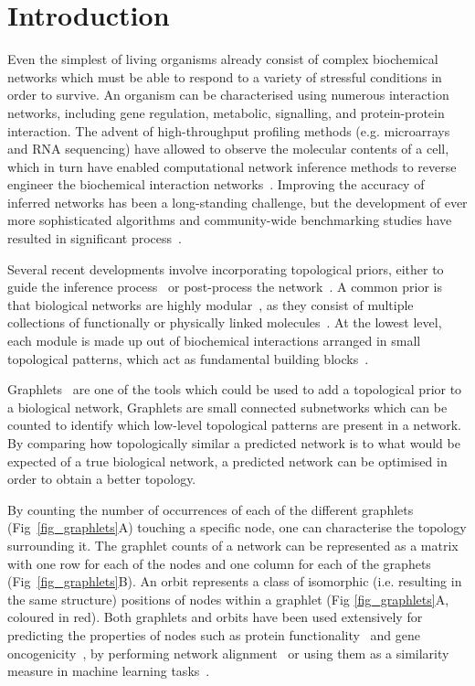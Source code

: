 \section*{Introduction}
Even the simplest of living organisms already consist of complex biochemical networks which must be able to respond to a variety of stressful conditions in order to survive. 
An organism can be characterised using numerous interaction networks, including gene regulation, metabolic, signalling, and protein-protein interaction. 
The advent of high-throughput profiling methods (e.g. microarrays and RNA sequencing) have allowed to observe the molecular contents of a cell, which in turn have enabled computational network inference methods to reverse engineer the biochemical interaction networks~\cite{Albert2007}.
Improving the accuracy of inferred networks has been a long-standing challenge, but the development of ever more sophisticated algorithms and community-wide benchmarking studies have resulted in significant process~\cite{Marbach2010, Narendra2011, Marbach2012, Aijo2017}. 

Several recent developments involve incorporating topological priors, either to guide the inference process~\cite{Lopes2014} or post-process the network~\cite{Ruyssinck2016}.
A common prior is that biological networks are highly modular~\cite{Rives2003}, as they consist of multiple collections of functionally or physically linked molecules~\cite{Hartwell1999,Barabasi2004}. At the lowest level, each module is made up out of biochemical interactions arranged in small topological patterns, which act as fundamental building blocks~\cite{Milo2002}.

Graphlets~\cite{Przulj2004} are one of the tools which could be used to add a topological prior to a biological network,
Graphlets are small connected subnetworks which can be counted to identify which low-level topological patterns are present in a network. By comparing how topologically similar a predicted network is to what would be expected of a true biological network, a predicted network can be optimised in order to obtain a better topology. 

By counting the number of occurrences of each of the different graphlets (Fig~\ref{fig_graphlets}A) touching a specific node, one can characterise the topology surrounding it. The graphlet counts of a network can be represented as a matrix with one row for each of the nodes and one column for each of the graphets (Fig~\ref{fig_graphlets}B). 
An orbit represents a class of isomorphic (i.e. resulting in the same structure) positions of nodes within a graphlet (Fig \ref{fig_graphlets}A, coloured in red).
Both graphlets and orbits have been used extensively for predicting the properties of nodes such as protein functionality~\cite{Milenkovic2008,Guerrero2008,Singh2014} and gene oncogenicity~\cite{Milenkovic2010a}, by performing network alignment~\cite{Kuchaiev2010,Milenkovic2013} or using them as a similarity measure in machine learning tasks~\cite{Shervashidze2009,Vacic2010}. 

